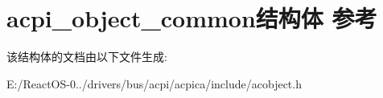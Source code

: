 \hypertarget{structacpi__object__common}{}\section{acpi\+\_\+object\+\_\+common结构体 参考}
\label{structacpi__object__common}


该结构体的文档由以下文件生成\+:\begin{DoxyCompactItemize}
\item 
E\+:/\+React\+O\+S-\/0../drivers/bus/acpi/acpica/include/acobject.\+h\end{DoxyCompactItemize}
